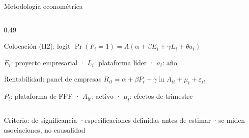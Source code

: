\begin{frame}{Metodología econométrica}
\begin{columns}[T]
    \begin{column}{0.49\textwidth}
      \begin{tarjeta}{Colocación (H2): logit}
        {\scriptsize$\Pr(F_i=1)=\Lambda(\alpha+\beta E_i+\gamma L_i+\theta a_i)$}\par\vspace{0.08cm}
        {\tiny $E_i$: proyecto empresarial · $L_i$: plataforma líder · $a_i$: año}
      \end{tarjeta}
      \begin{tarjeta}{Rentabilidad: panel de empresas}
        {\scriptsize$R_{it}=\alpha+\beta P_i+\gamma\ln A_{it}+\mu_t+\varepsilon_{it}$}\par\vspace{0.08cm}
        {\tiny $P_i$: plataforma de FPF · $A_{it}$: activo · $\mu_t$: efectos de trimestre}
      \end{tarjeta}
    \end{column}
  \end{columns}
  \vspace{0.2cm}
  {\scriptsize Criterio:  de significancia \enspace·\enspace especificaciones definidas antes de estimar \enspace·\enspace se miden asociaciones, no causalidad\par}
\end{frame}

